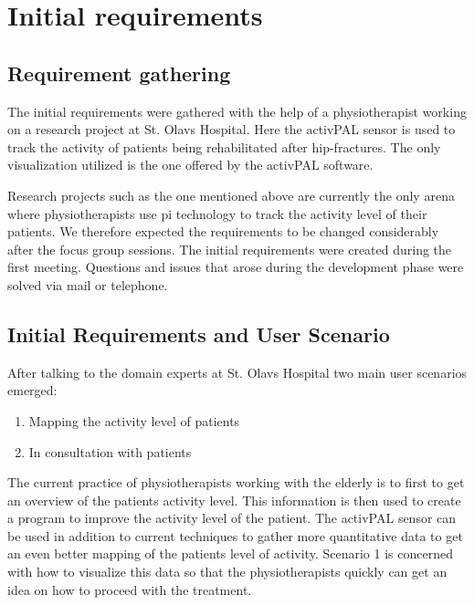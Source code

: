 \chapter{Initial requirements}

\section{Requirement gathering}
The initial requirements were gathered with the help of a physiotherapist working on a research project at St. Olavs Hospital. Here the activPAL sensor is used to track the activity of patients being rehabilitated after hip-fractures. The only visualization utilized is the one offered by the activPAL software.

Research projects such as the one mentioned above are currently the only arena where physiotherapists use \gls{pi} technology to track the activity level of their patients. We therefore expected the requirements to be changed considerably after the focus group sessions. The initial requirements were created during the first meeting. Questions and issues that arose during the development phase were solved via mail or telephone.

\section{Initial Requirements and User Scenario}
After talking to the domain experts at St. Olavs Hospital two main user scenarios emerged:
\vspace{-3mm}
\begin{enumerate}[itemsep=0cm, parsep=0cm]
  \item Mapping the activity level of patients
  \item In consultation with patients
\end{enumerate}

The current practice of physiotherapists working with the elderly is to first to get an overview of the patients activity level. This information is then used to create a program to improve the activity level of the patient. The activPAL sensor can be used in addition to current techniques to gather more quantitative data to get an even better mapping of the patients level of activity. Scenario 1 is concerned with how to visualize this data so that the physiotherapists quickly can get an idea on how to proceed with the treatment.

